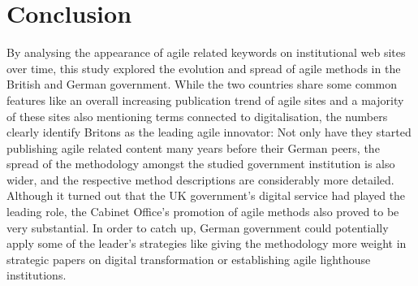 \section{Conclusion}\label{Conclusion}
By analysing the appearance of agile related keywords on institutional web sites over time, this study explored the evolution and spread of agile methods in the British and German government. While the two countries share some common features like an overall increasing publication trend of agile sites and a majority of these sites also mentioning terms connected to digitalisation, the numbers clearly identify Britons as the leading agile innovator: Not only have they started publishing agile related content many years before their German peers, the spread of the methodology amongst the studied government institution is also wider, and the respective method descriptions are considerably more detailed. Although it turned out that the UK government's digital service had played the leading role, the Cabinet Office's promotion of agile methods also proved to be very substantial. In order to catch up, German government could potentially apply some of the leader's strategies like giving the methodology more weight in strategic papers on digital transformation or establishing agile lighthouse institutions.
